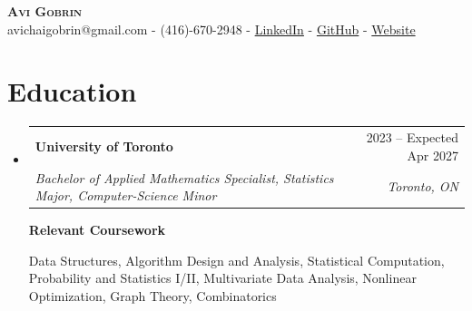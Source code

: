 \documentclass[letterpaper,11pt]{article}
\makeatletter
\newcommand{\resumeSubheading}[4]{
  \vspace{-2pt}\item
    \begin{tabular*}{0.97\textwidth}[t]{l@{\extracolsep{\fill}}r}
      \textbf{#1} & #2 \\
      \textit{\small#3} & \textit{\small #4} \\
    \end{tabular*}\vspace{-5pt}
}
\newcommand{\resumeSubHeadingListStart}{\begin{itemize}[leftmargin=0.15in, label={}]}
\newcommand{\resumeSubHeadingListEnd}{\end{itemize}}
\makeatother
\begin{document}
\begin{center}
    \textbf{\Huge \scshape Avi Gobrin} \\ \vspace{4pt}
    \small avichaigobrin@gmail.com - (416)-670-2948 - \href{https://www.linkedin.com/in/avigobrin/}{\color{blue} LinkedIn} - \href{https://github.com/Avi-Gobrin}{\color{blue} GitHub} - \href{https://avi-gobrin.github.io/personal-site/}{\color{blue} Website} \vspace{-4pt}
\end{center}

\section{Education}
  \resumeSubHeadingListStart
    \resumeSubheading
      {University of Toronto}{2023 -- Expected Apr 2027}
      {Bachelor of Applied Mathematics Specialist, Statistics Major, Computer-Science Minor}{Toronto, ON}
      \vspace{4pt}

    {\bf Relevant Coursework}
\vspace{-7pt}
{\small\setlength{\topsep}{0pt}\setlength{\parskip}{0pt}
\begin{flushleft}
Data Structures, Algorithm Design and Analysis, Statistical Computation, Probability and Statistics I/II, Multivariate Data Analysis, Nonlinear Optimization, Graph Theory, Combinatorics
\end{flushleft}}
  \resumeSubHeadingListEnd

\vspace{-15pt}
\end{document}
